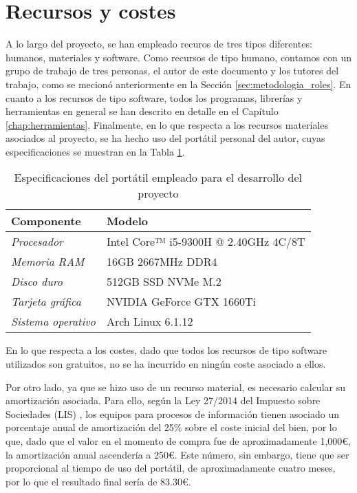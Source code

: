 \section{Recursos y costes}
\label{sec:planificacion_costes}

A lo largo del proyecto, se han empleado recuros de tres tipos diferentes: humanos, materiales y software.
Como recursos de tipo humano,
contamos con un grupo de trabajo de tres personas, el autor de este documento y los tutores del trabajo, 
como se mecionó anteriormente en la Sección \ref{sec:metodologia_roles}.
En cuanto a los recursos de tipo software, todos los programas, librerías y herramientas en general
se han descrito en detalle en el Capítulo \ref{chap:herramientas}.
Finalmente, en lo que respecta a los recursos materiales asociados al proyecto, se ha hecho uso del portátil personal del autor, 
cuyas especificaciones se muestran en la Tabla \ref{tab:costes_hardware}.

\bigskip
\begin{table}[H]
	\centering
	\begin{tabular}{|l|l|}
		\rowcolor{udcpink!25}
		\hline
		\small \textbf{Componente} & \small \textbf{Modelo} \\ \hline
		\small \textit{Procesador} & \small Intel Core™ i5-9300H @ 2.40GHz 4C/8T \\ \hline
		\small \textit{Memoria RAM} & \small 16GB 2667MHz DDR4 \\ \hline
		\small \textit{Disco duro} & \small 512GB SSD NVMe M.2 \\ \hline
		\small \textit{Tarjeta gráfica} & \small NVIDIA GeForce GTX 1660Ti \\ \hline
		\small \textit{Sistema operativo} & \small Arch Linux 6.1.12 \\ \hline
	\end{tabular}
	\caption{Especificaciones del portátil empleado para el desarrollo del proyecto}
	\label{tab:costes_hardware}
\end{table}

\bigskip
En lo que respecta a los costes, dado que todos los recursos de tipo software utilizados son gratuitos, no se ha incurrido en ningún coste
asociado a ellos.

\bigskip
Por otro lado, ya que se hizo uso de un recurso material,
es necesario calcular su amortización asociada. Para ello, según la Ley 27/2014 del Impuesto sobre Sociedades (LIS) \cite{leysociedades},
los equipos para procesos de información tienen asociado un porcentaje anual de amortización del 25\% sobre el coste inicial del bien,
por lo que, dado que el valor en el momento de compra fue de aproximadamente 1,000€, la amortización anual ascendería a 250€. Este número, sin embargo,
tiene que ser proporcional al tiempo de uso del portátil, de aproximadamente cuatro meses, por lo que el resultado final sería de 83.30€.

